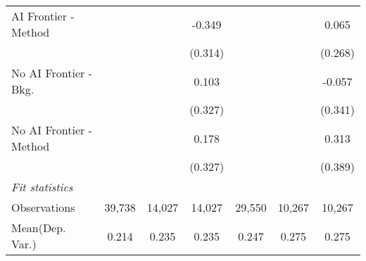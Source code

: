 \begin{tabular}{lcccccc}
   AI Frontier - Method    &              &             & -0.349       &              &              & 0.065\\   
                           &              &             & (0.314)      &              &              & (0.268)\\   
   No AI Frontier - Bkg.   &              &             & 0.103        &              &              & -0.057\\   
                           &              &             & (0.327)      &              &              & (0.341)\\   
   No AI Frontier - Method &              &             & 0.178        &              &              & 0.313\\   
                           &              &             & (0.327)      &              &              & (0.389)\\   
   \midrule
   \emph{Fit statistics}\\
   Observations            & 39,738       & 14,027      & 14,027       & 29,550       & 10,267       & 10,267\\  
Mean(Dep. Var.) & 0.214 & 0.235 & 0.235 & 0.247 & 0.275 & 0.275 \\
   

\end{tabular}
